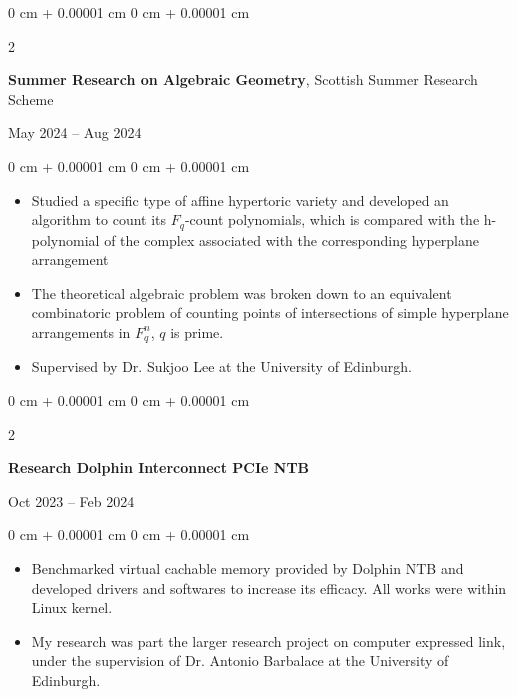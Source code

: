 \documentclass[10pt, a4paper]{article}
\newenvironment{highlights}{
    \begin{itemize}[
        topsep=0.10 cm,
        parsep=0.10 cm,
        partopsep=0pt,
        itemsep=0pt,
        leftmargin=0 cm + 10pt
    ]
}{
    \end{itemize}
} %
\newenvironment{onecolentry}{
    \begin{adjustwidth}{
        0 cm + 0.00001 cm
    }{
        0 cm + 0.00001 cm
    }
}{
    \end{adjustwidth}
} %
\newenvironment{twocolentry}[2][]{
    \onecolentry
    \def\secondColumn{#2}
    \setcolumnwidth{\fill, 4.5 cm}
    \begin{paracol}{2}
}{
    \switchcolumn \raggedleft \secondColumn
    \end{paracol}
    \endonecolentry
} %
\begin{document}
		\begin{twocolentry}{
	            May 2024 – Aug 2024
	        }
				\textbf{Summer Research on Algebraic Geometry}, Scottish Summer Research Scheme 
			\end{twocolentry}
	        \vspace{-0.30 cm}
	        \begin{onecolentry}
	            \begin{highlights}
	                \item Studied a specific type of affine hypertoric variety and developed an algorithm to count its $F_q$-count polynomials, which is compared with the h-polynomial of the complex associated with the corresponding hyperplane arrangement
					\item The theoretical algebraic problem was broken down to an equivalent combinatoric problem of counting points of intersections of simple hyperplane arrangements in $F^n_q$, $q$ is prime.
					\item Supervised by Dr. Sukjoo Lee at the University of Edinburgh.
	            \end{highlights}
	        \end{onecolentry}

        \vspace{0.2 cm}

        \begin{twocolentry}{
            Oct 2023 – Feb 2024
        }
            \textbf{Research Dolphin Interconnect PCIe NTB}
		\end{twocolentry}
        \vspace{0.10 cm}
        \begin{onecolentry}
            \begin{highlights}
				\item Benchmarked virtual cachable memory provided by Dolphin NTB and developed drivers and softwares to increase its efficacy.
				All works were within Linux kernel.
                \item My research was part the larger research project on computer expressed link, under the supervision of Dr. Antonio Barbalace at the University of Edinburgh.
            \end{highlights}
        \end{onecolentry}
		
\end{document}
